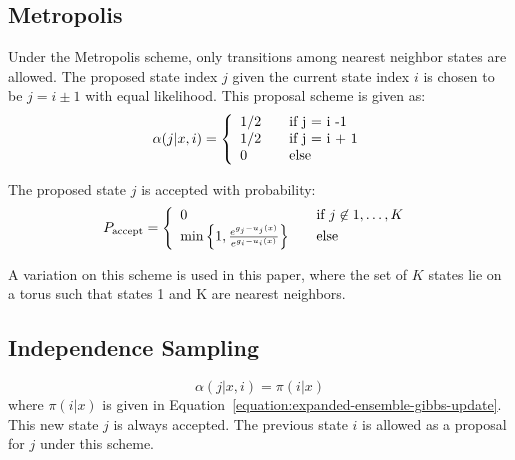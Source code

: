 \documentclass[superscriptaddress,showkeys, nofootinbib, pre, aps]{revtex4-1}
\begin{document}
\subsection{Metropolis }

Under the Metropolis scheme, only transitions among nearest neighbor states are allowed.  The proposed state index $j$ given the current state index $i$ is chosen to be $j = i \pm 1$ with equal likelihood.  This proposal scheme is given as:
\begin{equation}\label{eq:metproposal}
  \alpha(j| x, i) = \left\{
  \begin{array}{l l l}
    1/2 & \quad \text{if j = i -1}\\
    1/2 & \quad \text{if j = i + 1}\\
    0 & \quad \text{else}
  \end{array} \right.
\end{equation}

The proposed state $j$ is accepted with probability:
\begin{equation}\label{eq: metaccept}
  P_{\text{accept}} = \left\{
  \begin{array}{l l}
    0 & \quad \text{if $j \not\in {1,\ldots,K}$ }\\
    \min\left\{1, \frac{e^{g_j-u_j(x)}}{e^{g_i-u_i(x)}}\right\} &  \quad \text{else}\\
  \end{array} \right.
\end{equation}

A variation on this scheme is used in this paper, where the set of $K$ states lie on a torus such that states 1 and K are nearest neighbors.
\subsection{Independence Sampling}\label{sec:gibbs}
\begin{equation}\label{eq:gibbsproposal}
  \alpha(j|x, i) = \pi(i|x)
\end{equation}
where $\pi(i|x)$ is given in Equation~\ref{equation:expanded-ensemble-gibbs-update}.  This new state $j$ is always accepted.  The previous state $i$ is allowed as a proposal for $j$ under this scheme.
\end{document}
